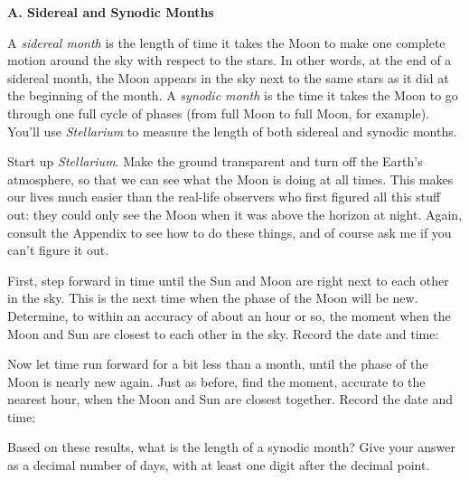 




\bigskip

{\bf A. Sidereal and Synodic Months}

A {\it sidereal month} is the length of time it takes the
Moon to make one complete motion around the sky with respect to the
stars.  In other words, at the end of a sidereal month, the Moon
appears in the sky next to the same stars as it did at the beginning
of the month.
A {\it synodic month} is the time it takes the Moon to go through one
full cycle of phases (from full Moon to full Moon, for example).
You'll use {\it Stellarium} to measure the length of both sidereal and
synodic months.

Start up {\it Stellarium}.  Make the ground transparent and turn
off the Earth's atmosphere, so that we can see what the Moon
is doing at all times. This makes our lives much easier
than the real-life observers who first figured all this stuff out:
they could only see the Moon when it was above the horizon at night.
Again, consult the Appendix to see how to do these things, and of course
ask me if you can't figure it out.

First, step forward in time until the Sun and Moon are right
next to each other in the sky. This is the next time when
the phase of the Moon will be new.
Determine, to within an accuracy of about an hour or so, the
moment when the Moon and Sun are closest to each other in
the sky.
Record the date and time:

\answerspace{1in}

Now let time run forward for a bit less than a month, until the phase of the Moon is nearly new
again.  Just as before, find the moment, accurate to the nearest hour,
when the Moon and Sun are closest together.  Record the date and time:

\answerspace{1in}

Based on these results, what is the length of a synodic month?
Give your answer as a decimal number of days, with at least
one digit after the decimal point.

